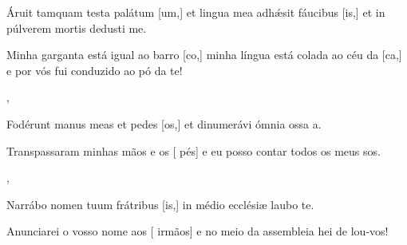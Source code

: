 {  {\item {}Áruit tamquam testa palátum [um,] et lingua mea adhǽsit fáucibus [is,] et in púlverem mortis dedusti me.~\Responsorium}%
    {\item {}Minha garganta está igual ao barro [co,] minha língua está colada ao céu da [ca,] e por vós fui conduzido ao pó da te!~\Responsorium},
  {\item {}Fodérunt manus meas et pedes [os,] et dinumerávi ómnia ossa a.~\Responsorium}%
    {\item {}Transpassaram minhas mãos e os [ pés] e eu posso contar todos os meus sos.~\Responsorium},
  {\item {}Narrábo nomen tuum frátribus [is,] in médio ecclésiæ laubo te.~\Responsorium}%
    {\item {}Anunciarei o vosso nome aos [ irmãos] e no meio da assembleia hei de lou-vos!~\Responsorium}
}